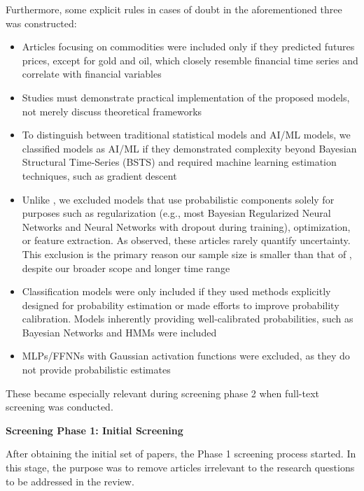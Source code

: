 Furthermore, some explicit rules in cases of doubt in the aforementioned three was constructed:
\begin{itemize}
    \item Articles focusing on commodities were included only if they predicted futures prices, except for gold and oil, which closely resemble financial time series and correlate with financial variables \parencite{Gokmenoglu2015}
    \item Studies must demonstrate practical implementation of the proposed models, not merely discuss theoretical frameworks
    \item To distinguish between traditional statistical models and AI/ML models, we classified models as AI/ML if they demonstrated complexity beyond Bayesian Structural Time-Series (BSTS) and required machine learning estimation techniques, such as gradient descent
    \item Unlike \textcite{Blasco_et_al_2024}, we excluded models that use probabilistic components solely for purposes such as regularization (e.g., most Bayesian Regularized Neural Networks and Neural Networks with dropout during training), optimization, or feature extraction. As \textcite{Blasco_et_al_2024} observed, these articles rarely quantify uncertainty. This exclusion is the primary reason our sample size is smaller than that of \textcite{Blasco_et_al_2024}, despite our broader scope and longer time range
    \item Classification models were only included if they used methods explicitly designed for probability estimation or made efforts to improve probability calibration. Models inherently providing well-calibrated probabilities, such as Bayesian Networks and HMMs were included
    \item MLPs/FFNNs with Gaussian activation functions were excluded, as they do not provide probabilistic estimates
\end{itemize}
These became especially relevant during screening phase 2 when full-text screening was conducted. 

\textbf{Screening Phase 1: Initial Screening}\nopagebreak

After obtaining the initial set of papers, the Phase 1 screening process started. In this stage, the purpose was to remove articles irrelevant to the research questions to be addressed in the review.

